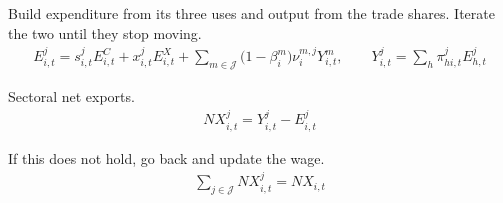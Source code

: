 \documentclass[11pt]{article}
\newcommand{\st}[1]{\medskip\noindent#1\ }
\begin{document}
\st{Build expenditure from its three uses and output from the trade shares. Iterate the two
until they stop moving.}
\begin{align}
E^j_{i,t}=s^j_{i,t}E^C_{i,t}+x^j_{i,t}E^X_{i,t}
+\sum_{m\in\mathcal{J}}\big(1-\beta^m_i\big)\nu^{m,j}_iY^m_{i,t},
\qquad
Y^j_{i,t}=\sum_h\pi^j_{hi,t}E^j_{h,t}
\end{align}


\st{Sectoral net exports.}
\begin{align}
NX^j_{i,t}=Y^j_{i,t}-E^j_{i,t}
\end{align}
 
\st{ If this does not hold, go back and update the wage.}
\begin{align}
\sum_{j\in\mathcal{J}}NX^j_{i,t}=NX_{i,t}
\end{align}
\end{document}
